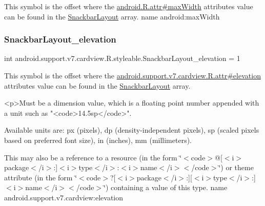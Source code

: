 This symbol is the offset where the \hyperlink{}{android.\+R.\+attr\#max\+Width} attribute\textquotesingle{}s value can be found in the \hyperlink{classandroid_1_1support_1_1v7_1_1cardview_1_1R_1_1styleable_aab664bb57daef291febbbab9c49f8fbf}{Snackbar\+Layout} array.  name android\+:max\+Width \mbox{\label{classandroid_1_1support_1_1v7_1_1cardview_1_1R_1_1styleable_a964a1df1d1968a300ceb9add6dd8ee9a}} 
\subsubsection{\texorpdfstring{Snackbar\+Layout\+\_\+elevation}{SnackbarLayout\_elevation}}
{\footnotesize\ttfamily int android.\+support.\+v7.\+cardview.\+R.\+styleable.\+Snackbar\+Layout\+\_\+elevation = 1\hspace{0.3cm}{\ttfamily [static]}}

This symbol is the offset where the \hyperlink{classandroid_1_1support_1_1v7_1_1cardview_1_1R_1_1attr_af8da2ee4ea221f8d413747edbfbf8ccb}{android.\+support.\+v7.\+cardview.\+R.\+attr\#elevation} attribute\textquotesingle{}s value can be found in the \hyperlink{classandroid_1_1support_1_1v7_1_1cardview_1_1R_1_1styleable_aab664bb57daef291febbbab9c49f8fbf}{Snackbar\+Layout} array.

\begin{DoxyVerb}      <p>Must be a dimension value, which is a floating point number appended with a unit such as "<code>14.5sp</code>".
\end{DoxyVerb}
 Available units are\+: px (pixels), dp (density-\/independent pixels), sp (scaled pixels based on preferred font size), in (inches), mm (millimeters). 

This may also be a reference to a resource (in the form \char`\"{}$<$code$>$@\mbox{[}$<$i$>$package$<$/i$>$\+:\mbox{]}$<$i$>$type$<$/i$>$\+:$<$i$>$name$<$/i$>$$<$/code$>$\char`\"{}) or theme attribute (in the form \char`\"{}$<$code$>$?\mbox{[}$<$i$>$package$<$/i$>$\+:\mbox{]}\mbox{[}$<$i$>$type$<$/i$>$\+:\mbox{]}$<$i$>$name$<$/i$>$$<$/code$>$\char`\"{}) containing a value of this type.  name android.\+support.\+v7.\+cardview\+:elevation \mbox{\label{classandroid_1_1support_1_1v7_1_1cardview_1_1R_1_1styleable_a9640f431c4f2b457dc8b393e43e89ba9}} 
